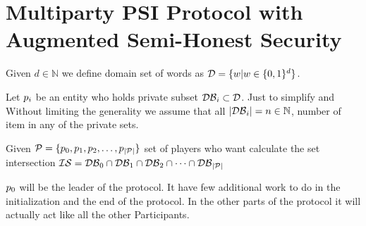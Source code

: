 \section{Multiparty PSI Protocol with Augmented Semi-Honest Security}

Given $d \in \mathbb{N} $ we define domain set of words as $\mathcal{D} = \{ w | w \in \{0,1\}^{d}\} $.

 

Let $p_{i}$ be an entity who holds private subset $\mathcal{DB}_{i} \subset \mathcal{D}$.
Just to simplify and Without limiting the generality we assume that all $|\mathcal{DB}_{i}| = n \in \mathbb{N}$, number of item in any of the private sets.


Given $\mathcal{P} = \{p_{0},p_{1},p_{2},\dots,p_{| \mathcal{P} |}\}$ set of players who want calculate the set intersection $\mathcal{IS} = \mathcal{DB}_{0} \cap \mathcal{DB}_{1} \cap \mathcal{DB}_{2} \cap \dots \cap \mathcal{DB}_{| \mathcal{P} |} $ 

$p_{0}$ will be the leader of the protocol. It have few additional work to do in the initialization and the end of the protocol. In the other parts of the protocol it will actually act like all the other Participants. 


